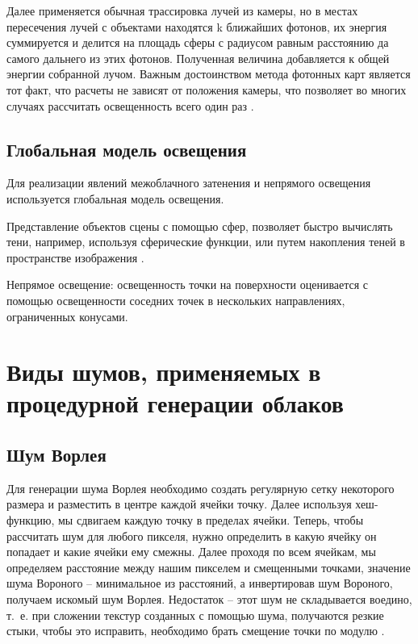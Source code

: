 {Далее применяется обычная трассировка лучей из камеры, но в местах пересечения лучей с объектами находятся k ближайших фотонов, их энергия суммируется и делится на площадь сферы с радиусом равным расстоянию да самого дальнего из этих фотонов. Полученная величина добавляется к общей энергии собранной лучом. Важным  достоинством  метода  фотонных  карт  является  тот  факт,  что  расчеты  не 
зависят  от  положения  камеры,  что  позволяет во  многих  случаях  рассчитать  освещенность 
всего  один  раз \cite{photon}.

\subsection{Глобальная модель освещения}

Для реализации явлений межоблачного затенения и непрямого освещения используется глобальная модель освещения.

Представление объектов сцены с помощью сфер, позволяет быстро вычислять тени, например, используя сферические функции, или путем накопления теней в пространстве изображения \cite{clouds}.

Непрямое освещение: освещенность точки на поверхности оценивается с помощью освещенности соседних точек в нескольких направлениях, ограниченных конусами.
}
\section{Виды шумов, применяемых в процедурной генерации облаков}

\subsection{Шум Ворлея}

Для генерации шума Ворлея необходимо создать регулярную сетку некоторого размера и разместить в центре каждой ячейки точку. Далее используя хеш-функцию, мы сдвигаем каждую точку в пределах ячейки. Теперь, чтобы рассчитать шум для любого пикселя, нужно определить в какую ячейку он попадает и какие ячейки ему смежны. Далее проходя по всем ячейкам, мы определяем расстояние между нашим пикселем и смещенными точками, значение шума Вороного – минимальное из расстояний, а инвертировав шум Вороного, получаем искомый шум Ворлея. 
Недостаток – этот шум не складывается воедино, т.~е. при сложении текстур созданных с помощью шума, получаются резкие стыки, чтобы это исправить, необходимо брать смещение точки по модулю \cite{worley}.

